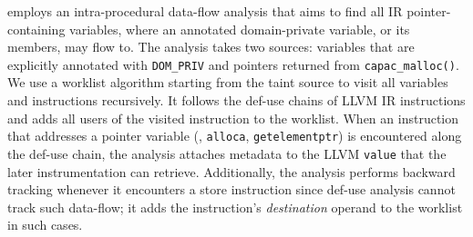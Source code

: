 


\thename employs an intra-procedural data-flow analysis that aims to find all IR pointer-containing variables, where an annotated domain-private variable, or its members, may flow to.
The analysis takes two sources: variables that are explicitly annotated with \texttt{DOM\_PRIV} and pointers returned from \texttt{capac\_malloc()}.
We use a worklist algorithm starting from the taint source to visit all variables and instructions recursively.
It follows the def-use chains of LLVM IR instructions and adds all users of the visited instruction to the worklist.
When an instruction that addresses a pointer variable (\eg, \texttt{alloca}, \texttt{getelementptr}) is encountered along the def-use chain, the analysis attaches metadata to the LLVM \texttt{value} that the later instrumentation can retrieve.
Additionally, the analysis performs backward tracking whenever it encounters a store instruction since def-use analysis cannot track such data-flow; it adds the instruction's \emph{destination} operand to the worklist in such cases.



